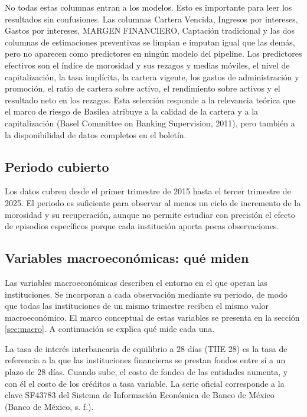 
No todas estas columnas entran a los modelos. Esto es importante para leer los resultados sin confusiones. Las columnas Cartera Vencida, Ingresos por intereses, Gastos por intereses, MARGEN FINANCIERO, Captación tradicional y las dos columnas de estimaciones preventivas se limpian e imputan igual que las demás, pero no aparecen como predictores en ningún modelo del pipeline. Los predictores efectivos son el índice de morosidad y sus rezagos y medias móviles, el nivel de capitalización, la tasa implícita, la cartera vigente, los gastos de administración y promoción, el ratio de cartera sobre activo, el rendimiento sobre activos y el resultado neto en los rezagos. Esta selección responde a la relevancia teórica que el marco de riesgo de Basilea atribuye a la calidad de la cartera y a la capitalización (Basel Committee on Banking Supervision, 2011), pero también a la disponibilidad de datos completos en el boletín.

\subsection{Periodo cubierto}
Los datos cubren desde el primer trimestre de 2015 hasta el tercer trimestre de 2025. El periodo es suficiente para observar al menos un ciclo de incremento de la morosidad y su recuperación, aunque no permite estudiar con precisión el efecto de episodios específicos porque cada institución aporta pocas observaciones. %

\subsection{Variables macroeconómicas: qué miden}
Las variables macroeconómicas describen el entorno en el que operan las instituciones. Se incorporan a cada observación mediante su periodo, de modo que todas las instituciones de un mismo trimestre reciben el mismo valor macroeconómico. El marco conceptual de estas variables se presenta en la sección \ref{sec:macro}. A continuación se explica qué mide cada una.

La tasa de interés interbancaria de equilibrio a 28 días (TIIE 28) es la tasa de referencia a la que las instituciones financieras se prestan fondos entre sí a un plazo de 28 días. Cuando sube, el costo de fondeo de las entidades aumenta, y con él el costo de los créditos a tasa variable. La serie oficial corresponde a la clave SF43783 del Sistema de Información Económica de Banco de México (Banco de México, s. f.).

